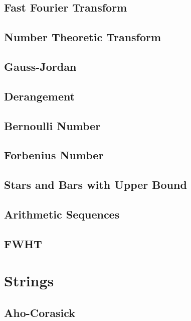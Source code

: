 \subsection{Fast Fourier Transform}

\subsection{Number Theoretic Transform}

\subsection{Gauss-Jordan}

\subsection{Derangement}

\subsection{Bernoulli Number}

\subsection{Forbenius Number}

\subsection{Stars and Bars with Upper Bound}

\subsection{Arithmetic Sequences}

\subsection{FWHT}

\section{Strings}
\subsection{Aho-Corasick}

